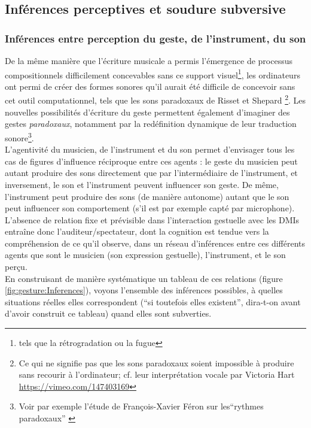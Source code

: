 \subsection{Inférences perceptives et soudure subversive}
\label{sec:gesture:inferences-soudure}

\subsubsection{Inférences entre perception du geste, de l'instrument, du son}
\label{sec:gesture:inferences-soudure:inferences}

\noindent De la même manière que l'écriture musicale a permis l'émergence de processus compositionnels difficilement concevables sans ce support visuel\footnote{tels que la rétrogradation ou la fugue}, les ordinateurs ont permi de créer des formes sonores qu'il aurait été difficile de concevoir sans cet outil computationnel, tels que les sons paradoxaux de Risset et Shepard \footnote{Ce qui ne signifie pas que les sons paradoxaux soient impossible à produire sans recourir à l'ordinateur; cf. leur interprétation vocale par Victoria Hart \url{https://vimeo.com/147403169}}. Les nouvelles possibilités d'écriture du geste permettent également d'imaginer des gestes \textit{paradoxaux}, notamment par la redéfinition dynamique de leur traduction sonore\footnote{Voir par exemple l'étude de François-Xavier Féron sur les``rythmes paradoxaux'' \cite{feron_lart_2010}}.\\
\indent L'agentivité du musicien, de l'instrument et du son permet d'envisager tous les cas de figures d'influence réciproque entre ces agents : le geste du musicien peut autant produire des sons directement que par l'intermédiaire de l'instrument, et inversement, le son et l'instrument peuvent influencer son geste. De même, l'instrument peut produire des sons (de manière autonome) autant que le son peut influencer son comportement (s'il est par exemple capté par microphone). L'absence de relation fixe et prévisible dans l'interaction gestuelle avec les \glspl{DMI} entraîne donc l'auditeur/spectateur, dont la cognition est tendue vers la compréhension de ce qu'il observe, dans un réseau d'inférences entre ces différents agents que sont le musicien (son expression gestuelle), l'instrument, et le son perçu.\\
\indent En construisant de manière systématique un tableau de ces relations (figure \ref{fig:gesture:Inferences}), voyons l'ensemble des inférences possibles, à quelles situations réelles elles correspondent (``si toutefois elles existent'', dira-t-on avant d'avoir construit ce tableau) quand elles sont subverties.
